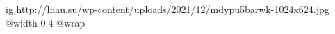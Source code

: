 
 
 
 
 

\ifcmt
  ig http://lnau.su/wp-content/uploads/2021/12/mdypu5barwk-1024x624.jpg
  @width 0.4
  @wrap 
\fi
